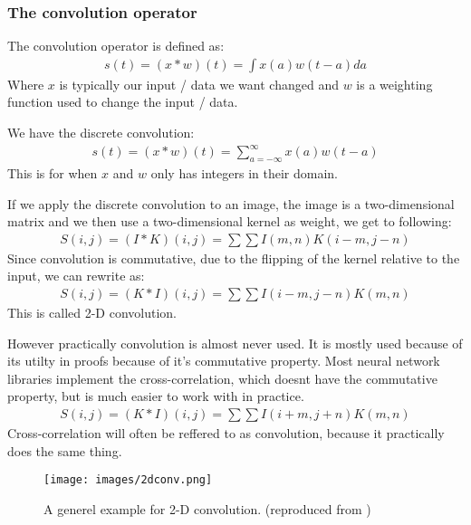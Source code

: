 \documentclass[a4paper,12pt]{article}
\begin{document}
\subsubsection{The convolution operator}
The convolution operator is defined as:
\begin{align}
  s(t)=(x * w)(t)=\int x(a) w(t-a) d a
\end{align}
Where $x$ is typically our input / data we want changed and $w$ is a weighting function used to change the input / data.

We have the discrete convolution:
\begin{align}
  s(t)=(x * w)(t)=\sum_{a=-\infty}^{\infty} x(a) w(t-a)
\end{align}
This is for when $x$ and $w$ only has integers in their domain.

If we apply the discrete convolution to an image, the image is a two-dimensional matrix and we then use a two-dimensional kernel as weight, we get to following:
\begin{align}
  S(i, j)=(I * K)(i, j)=\sum \sum I(m, n) K(i-m, j-n)
\end{align}
Since convolution is commutative, due to the flipping of the kernel relative to the input, we can rewrite as:
\begin{align}
  S(i, j)=(K * I)(i, j)=\sum \sum I(i-m, j-n) K(m, n)
\end{align}
This is called 2-D convolution.

However practically convolution is almost never used. It is mostly used because of its utilty in proofs because of it's commutative property.
Most neural network libraries implement the cross-correlation, which doesnt have the commutative property, but is much easier to work with in practice.
\begin{align}
  S(i, j)=(K * I)(i, j)=\sum \sum I(i+m, j+n) K(m, n)
\end{align}
Cross-correlation will often be reffered to as convolution, because it practically does the same thing.
\begin{figure}[H]
  \centering
  \texttt{[image: images/2dconv.png]}
  \caption{A generel example for 2-D convolution. (reproduced from \cite{goodfellow2016figure2})} %
  \label{fig:n6}
\end{figure}
\end{document}
